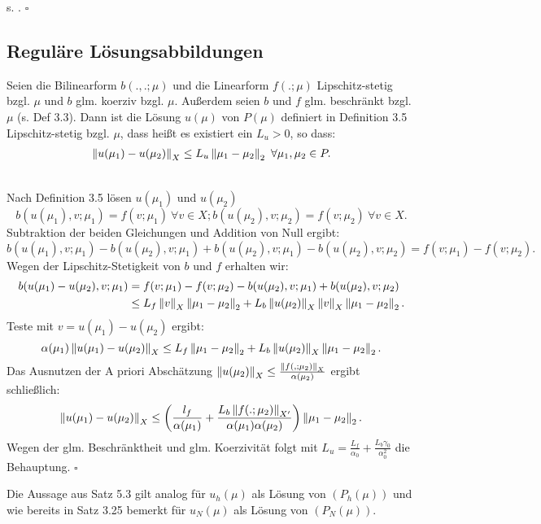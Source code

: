  s. \cite{PatRoz2006}.
\hfill $\square$

\subsection{Reguläre Lösungsabbildungen}

Seien die Bilinearform $b(.,.;\mu)$ und die Linearform $f(.;\mu)$ Lipschitz-stetig bzgl. $\mu$ und $b$ glm. koerziv bzgl. $\mu$.
Außerdem seien $b$ und $f$ glm. beschränkt bzgl. $\mu$ (s. Def 3.3).
Dann ist die Lösung $u(\mu)$ von $P(\mu)$ definiert in Definition 3.5 Lipschitz-stetig bzgl. $\mu$, dass heißt es existiert ein $L_u>0$, so dass:
\begin{align}
\left\Vert u(\mu_1)-u(\mu_2)\right\Vert_X \le L_u \left\Vert\mu_1-\mu_2\right\Vert_2~\forall \mu_1,\mu_2\in P.
\end{align}

\\
Nach Definition 3.5 lösen $u(\mu_1)$ und $u(\mu_2)$
\[
b(u(\mu_1),v;\mu_1) = f(v;\mu_1)~\forall v\in X; b(u(\mu_2),v;\mu_2) = f(v;\mu_2)~\forall v\in X.
\]
Subtraktion der beiden Gleichungen und Addition von Null ergibt:
\[
b(u(\mu_1),v;\mu_1) - b(u(\mu_2),v;\mu_1) + b(u(\mu_2),v;\mu_1) -b(u(\mu_2),v;\mu_2) = f(v;\mu_1) -f(v;\mu_2).
\]
Wegen der Lipschitz-Stetigkeit von $b$ und $f$ erhalten wir:
\begin{align*}
b(u(\mu_1)-u(\mu_2),v;\mu_1) &= f(v;\mu_1) -f(v;\mu_2) - b(u(\mu_2),v;\mu_1) +  b(u(\mu_2),v;\mu_2)\\
&\le L_f \left\Vert v\right\Vert_X \left\Vert\mu_1-\mu_2\right\Vert_2 +L_b \left\Vert u(\mu_2)\right\Vert_X \left\Vert v\right\Vert_X \left\Vert\mu_1-\mu_2\right\Vert_2.
\end{align*}
Teste mit $v = u(\mu_1)-u(\mu_2)$ ergibt:
\[
\alpha(\mu_1) \left\Vert u(\mu_1)-u(\mu_2)\right\Vert_X \le L_f \left\Vert\mu_1-\mu_2\right\Vert_2 +L_b \left\Vert u(\mu_2)\right\Vert_X \left\Vert\mu_1-\mu_2\right\Vert_2.
\]
Das Ausnutzen der A priori Abschätzung $\left\Vert u(\mu_2)\right\Vert_X \le \frac{\left\Vert f(,;\mu_2)\right\Vert_X}{\alpha(\mu_2)}$ ergibt schließlich:
\[
\left\Vert u(\mu_1)-u(\mu_2)\right\Vert_X \le \left( \frac{l_f}{\alpha(\mu_1)} + \frac{L_b \left\Vert f(.;\mu_2)\right\Vert_{X'}}{\alpha(\mu_1)\alpha(\mu_2)}\right) \left\Vert\mu_1-\mu_2\right\Vert_2.
\]
Wegen der glm. Beschränktheit und glm. Koerzivität folgt mit $L_u = \frac{L_f}{\alpha_0} + \frac{L_b \gamma_0}{\alpha_0^2}$ die Behauptung.
\hfill $\square$

Die Aussage aus Satz 5.3 gilt analog für $u_h(\mu)$ als Lösung von $(P_h(\mu))$ und wie bereits in Satz 3.25 bemerkt für $u_N(\mu)$ als Lösung von $(P_N(\mu))$.

